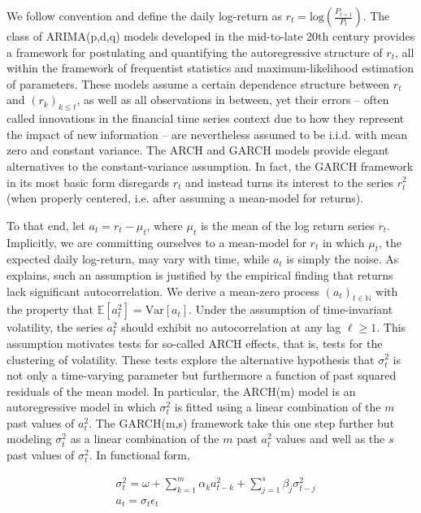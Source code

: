 \documentclass[11pt]{article}
\def\mrm#1{\mathrm{#1}} %
\def\E{\mathbb{E}} %
\theoremstyle{definition}
\begin{document}
We follow convention and define the daily log-return as $r_{t} = \text{log}(\frac{P_{t+1}}{P_{t}})$.  The class of ARIMA(p,d,q) models developed in the mid-to-late 20th century provides a framework for postulating and quantifying the autoregressive structure of $r_{t}$, all within the framework of frequentist statistics and maximum-likelihood estimation of parameters.  These models assume a certain dependence structure between $r_{t}$ and $(r_{k})_{k\leq t}$, as well as all observations in between, yet their errors -- often called innovations in the financial time series context due to how they represent the impact of new information -- are nevertheless assumed to be i.i.d. with mean zero and constant variance.  The ARCH \citep{engle1982autoregressive} and GARCH \citep{bollerslev1986generalized} models provide elegant alternatives to the constant-variance assumption.  In fact, the GARCH framework in its most basic form disregards $r_{t}$ and instead turns its interest to the series $r_{t}^{2}$ (when properly centered, i.e. after assuming a mean-model for returns).  

To that end, let $a_{t} = r_{t} - \mu_{t}$, where $\mu_{t}$ is the mean of the log return series $r_{t}$.  Implicitly, we are committing ourselves to a mean-model for $r_{t}$ in which $\mu_{t}$, the expected daily log-return, may vary with time, while $a_{t}$ is simply the noise.  As \citet{cont2001empirical} explains, such an assumption is justified by the empirical finding that returns lack significant autocorrelation.  We derive a mean-zero process $(a_{t})_{t\in\mathbb{N}}$ with the property that $\E[a^{2}_{t}] = \mrm{Var}[a_{t}]$.  Under the assumption of time-invariant volatility, the series $a_{t}^{2}$ should exhibit no autocorrelation at any lag $\ell\geq1$.  This assumption motivates tests for so-called ARCH effects, that is, tests for the clustering of volatility.  These tests explore the alternative hypothesis that $\sigma_{t}^{2}$ is not only a time-varying parameter but furthermore a function of past squared residuals of the mean model.  In particular, the ARCH(m) model is an autoregressive model in which $\sigma_{t}^{2}$ is fitted using a linear combination of the $m$ past values of $a_{t}^{2}$.  The GARCH(m,s) framework take this one step further but modeling $\sigma_{t}^{2}$ as a linear combination of the $m$ past $a_{t}^{2}$ values and well as the $s$ past values of $\sigma_{t}^{2}$.  In functional form,

\begin{align*}
&\sigma_{t}^{2} = \omega + \sum^{m}_{k=1}\alpha_{k}a^{2}_{t-k} + \sum_{j=1}^{s}\beta_{j}\sigma_{t-j}^{2}\\
&a_{t} = \sigma_{t}\epsilon_{t}
\end{align*}
\end{document}
